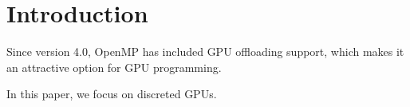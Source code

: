 \section{Introduction}
\label{sect:intro}

Since version 4.0, OpenMP has included GPU offloading support, which makes it an attractive option for GPU programming.

In this paper, we focus on discreted GPUs.

